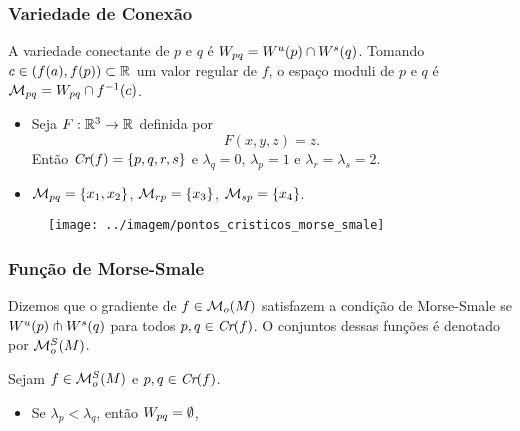 \documentclass{beamer}
\begin{document}
\begin{footnotesize}
	\begin{frame}
		\frametitle{Variedade de Conexão}
		\begin{definicao}
			A variedade conectante de $p$ e $q$ é $W_{pq} = W^{u}(p)\cap W^{s}(q)$. Tomando $c \in (f(a), f(p)) \subset \mathbb{R}^{}$ um valor regular de $f$, o espaço moduli de $p$ e $q$ é $\mathcal{M}_{pq} = W_{pq}\cap f^{-1}(c)$.
		\end{definicao}
		
		\begin{minipage}[t]{0.55\linewidth}
			
			\begin{itemize}
				\item Seja $F:\mathbb{R}^{3} \to \mathbb{R}^{}$ definida por 
				$$
				F(x, y, z) = z.
				$$
				Então $\textit{Cr}(f) = \{p,q,r,s\}$ e $\lambda_{q} = 0$, $\lambda_{p} = 1$ e $\lambda_{r}=\lambda_{s} = 2$. 
				
				\item $\mathcal{M}_{pq}=\{x_{1}, x_{2}\}$, $\mathcal{M}_{rp} = \{ x_{3}\}$, $\mathcal{M}_{sp} = \{x_{4} \}$.
			\end{itemize}
		\end{minipage}
		\hfill%
		\begin{minipage}[t]{0.4\linewidth}
			\begin{figure}
				\centering
				\textbf{}\par
				\texttt{[image: ../imagem/pontos\_cristicos\_morse\_smale]}
			\end{figure}
			
		\end{minipage}
	\end{frame}
	
	\begin{frame}
		\frametitle{Função de Morse-Smale}
		\begin{definicao}
			Dizemos que o gradiente de $f \in \mathcal{M}_{o}(M)$ satisfazem a condição de Morse-Smale se $W^{u}(p)\pitchfork W^{s}(q)$ para todos $p,q \in \textit{Cr}(f)$. O conjuntos dessas funções é denotado por $\mathcal{M}^{S}_{o}(M)$.
		\end{definicao}
			
		\begin{proposicao}
			Sejam $f \in \mathcal{M}^{S}_{o}(M)$ e $p,q \in \textit{Cr}(f)$.
			\begin{itemize}
				\item Se $\lambda_{p}<\lambda_{q}$, então $W_{pq} = \emptyset$,
				

\end{itemize}
\end{proposicao}
\end{frame}
\end{footnotesize}
\end{document}
